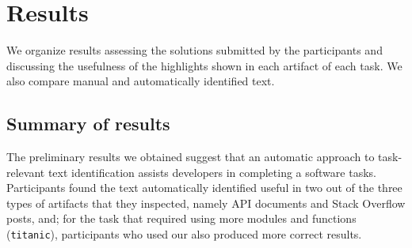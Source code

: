 
\section{Results}
\label{cp6:results}

We organize results assessing the solutions submitted by the participants
and discussing the usefulness of the highlights shown 
in each artifact of each task. We also compare manual and automatically identified text.









\subsection{Summary of results}


The preliminary results we obtained suggest that 
an automatic approach to task-relevant text identification
assists 
developers in completing a software tasks. 
Participants found the text automatically identified
useful in two out of the three types of artifacts that they inspected, 
namely API documents and Stack Overflow posts, and; 
for the task that required using more modules and functions (\texttt{titanic}),
participants who used our also produced more correct results.




